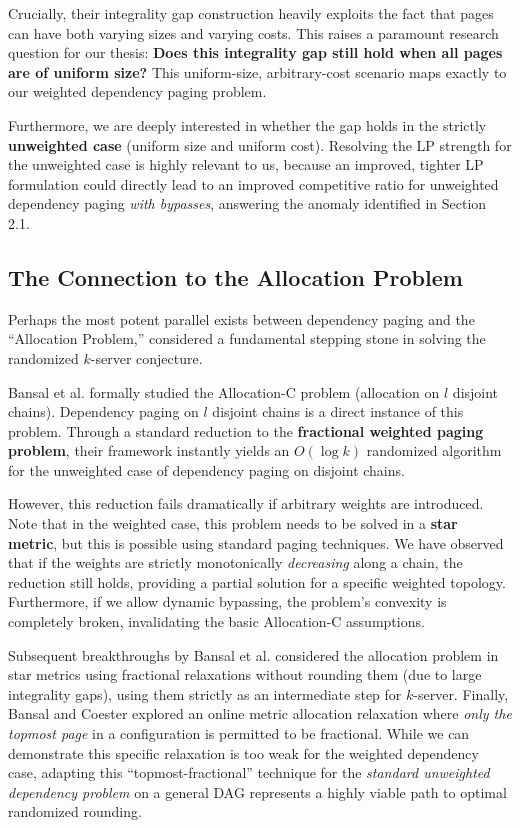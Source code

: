 \documentclass[a4paper,11pt]{article}
\begin{document}
Crucially, their integrality gap construction heavily exploits the fact that pages can have both varying sizes and varying costs. This raises a paramount research question for our thesis: \textbf{Does this integrality gap still hold when all pages are of uniform size?} This uniform-size, arbitrary-cost scenario maps exactly to our weighted dependency paging problem. 

Furthermore, we are deeply interested in whether the gap holds in the strictly \textbf{unweighted case} (uniform size and uniform cost). Resolving the LP strength for the unweighted case is highly relevant to us, because an improved, tighter LP formulation could directly lead to an improved competitive ratio for unweighted dependency paging \textit{with bypasses}, answering the anomaly identified in Section 2.1.

\subsection{The Connection to the Allocation Problem}
Perhaps the most potent parallel exists between dependency paging and the ``Allocation Problem,'' considered a fundamental stepping stone in solving the randomized $k$-server conjecture. 

Bansal et al. \cite{bansal2010towards} formally studied the Allocation-C problem (allocation on $l$ disjoint chains). Dependency paging on $l$ disjoint chains is a direct instance of this problem. Through a standard reduction to the \textbf{fractional weighted paging problem}, their framework instantly yields an $O(\log k)$ randomized algorithm for the unweighted case of dependency paging on disjoint chains. 

However, this reduction fails dramatically if arbitrary weights are introduced. Note that in the weighted case, this problem needs to be solved in a \textbf{star metric}, but this is possible using standard paging techniques. We have observed that if the weights are strictly monotonically \textit{decreasing} along a chain, the reduction still holds, providing a partial solution for a specific weighted topology. Furthermore, if we allow dynamic bypassing, the problem's convexity is completely broken, invalidating the basic Allocation-C assumptions.

Subsequent breakthroughs by Bansal et al. \cite{bansal2015polylogarithmic} considered the allocation problem in star metrics using fractional relaxations without rounding them (due to large integrality gaps), using them strictly as an intermediate step for $k$-server. Finally, Bansal and Coester \cite{bansal2021online} explored an online metric allocation relaxation where \textit{only the topmost page} in a configuration is permitted to be fractional. While we can demonstrate this specific relaxation is too weak for the weighted dependency case, adapting this ``topmost-fractional'' technique for the \textit{standard unweighted dependency problem} on a general DAG represents a highly viable path to optimal randomized rounding.
\end{document}
